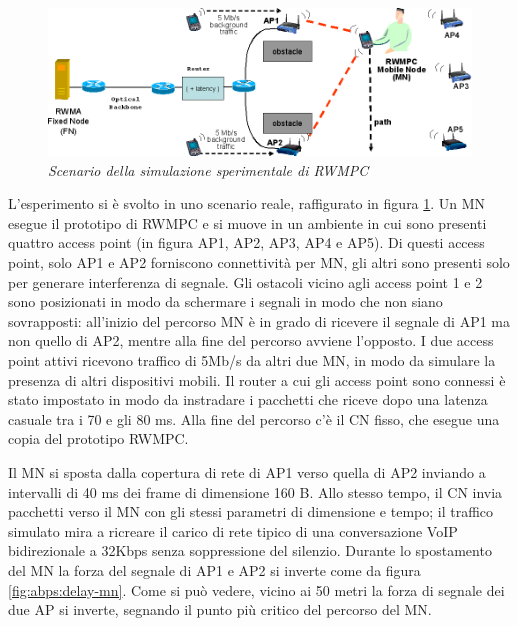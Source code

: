 \documentclass[12pt,a4paper,openright,twoside]{book}
\begin{document}
\begin{figure}
  \centering
  \includegraphics[width=\textwidth]{img/abps-simulazione}
  \caption{\em Scenario della simulazione sperimentale di RWMPC}
  \label{fig:abps:simulazione}
\end{figure}

L'esperimento si è svolto in uno scenario reale, raffigurato in figura
\ref{fig:abps:simulazione}. Un MN esegue il prototipo di RWMPC e si
muove in un ambiente in cui sono presenti quattro access point (in
figura AP1, AP2, AP3, AP4 e AP5). Di questi access point, solo AP1 e
AP2 forniscono connettività per MN, gli altri sono presenti solo per
generare interferenza di segnale. Gli ostacoli vicino agli access
point 1 e 2 sono posizionati in modo da schermare i segnali in modo
che non siano sovrapposti: all'inizio del percorso MN è in grado di
ricevere il segnale di AP1 ma non quello di AP2, mentre alla fine del
percorso avviene l'opposto. I due access point attivi ricevono
traffico di 5Mb/s da altri due MN, in modo da simulare la presenza di
altri dispositivi mobili. Il router a cui gli access point sono
connessi è stato impostato in modo da instradare i pacchetti che
riceve dopo una latenza casuale tra i 70 e gli 80 ms. Alla fine del
percorso c'è il CN fisso, che esegue una copia del prototipo RWMPC.

Il MN si sposta dalla copertura di rete di AP1 verso quella di AP2
inviando a intervalli di 40 ms dei frame di dimensione 160 B. Allo
stesso tempo, il CN invia pacchetti verso il MN con gli stessi
parametri di dimensione e tempo; il traffico simulato mira a ricreare
il carico di rete tipico di una conversazione VoIP bidirezionale a
32Kbps senza soppressione del silenzio. Durante lo spostamento del MN
la forza del segnale di AP1 e AP2 si inverte come da figura
\ref{fig:abps:delay-mn}. Come si può vedere, vicino ai 50 metri la
forza di segnale dei due AP si inverte, segnando il punto più critico
del percorso del MN.
\end{document}

